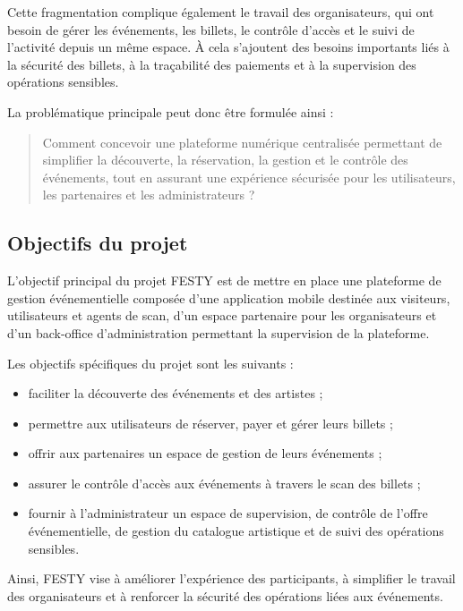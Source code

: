 Cette fragmentation complique également le travail des organisateurs, qui ont besoin de gérer les événements, les billets, le contrôle d’accès et le suivi de l’activité depuis un même espace. À cela s’ajoutent des besoins importants liés à la sécurité des billets, à la traçabilité des paiements et à la supervision des opérations sensibles.


La problématique principale peut donc être formulée ainsi :


\begin{quote}
Comment concevoir une plateforme numérique centralisée permettant de simplifier la découverte, la réservation, la gestion et le contrôle des événements, tout en assurant une expérience sécurisée pour les utilisateurs, les partenaires et les administrateurs ?
\end{quote}


\subsection{Objectifs du projet}


L’objectif principal du projet FESTY est de mettre en place une plateforme de gestion événementielle composée d’une application mobile destinée aux visiteurs, utilisateurs et agents de scan, d’un espace partenaire pour les organisateurs et d’un back-office d’administration permettant la supervision de la plateforme.


Les objectifs spécifiques du projet sont les suivants :


\begin{itemize}
  \item faciliter la découverte des événements et des artistes ;
  \item permettre aux utilisateurs de réserver, payer et gérer leurs billets ;
  \item offrir aux partenaires un espace de gestion de leurs événements ;
  \item assurer le contrôle d’accès aux événements à travers le scan des billets ;
  \item fournir à l’administrateur un espace de supervision, de contrôle de l’offre événementielle, de gestion du catalogue artistique et de suivi des opérations sensibles.
\end{itemize}


Ainsi, FESTY vise à améliorer l’expérience des participants, à simplifier le travail des organisateurs et à renforcer la sécurité des opérations liées aux événements.


